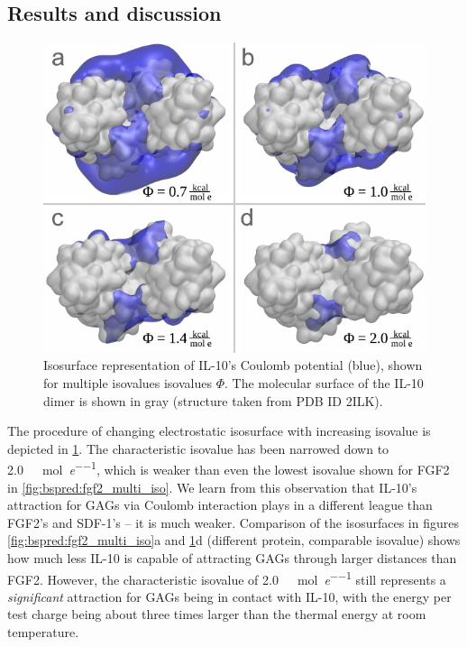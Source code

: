 \subsection{Results and discussion}
\label{bspred:il10}

\begin{figure}
\centering
\includegraphics[width=1.0\textwidth]{gfx/bspred/il10_top_coulomb_isosurfaces_different_values_03_ds.pdf}
\caption[]{
Isosurface representation of IL-10's Coulomb potential (blue), shown for
multiple isovalues isovalues $\Phi$. The molecular surface of the IL-10 dimer is
shown in gray (structure taken from PDB ID 2ILK).
}
\label{fig:bspred:il10_multi_iso}
\end{figure}


The procedure of changing electrostatic isosurface with increasing isovalue is
depicted in \cref{fig:bspred:il10_multi_iso}. The characteristic isovalue has
been narrowed down to \SI{2.0}{\kilo\calory\per\mole\per\elementarycharge},
which is weaker than even the lowest isovalue shown for FGF2 in
\cref{fig:bspred:fgf2_multi_iso}. We learn from this observation that IL-10's
attraction for GAGs via Coulomb interaction plays in a different league than
FGF2's and SDF-1's -- it is much weaker. Comparison of the isosurfaces in
figures \ref{fig:bspred:fgf2_multi_iso}a and \ref{fig:bspred:il10_multi_iso}d
(different protein, comparable isovalue) shows how much less IL-10 is capable of
attracting GAGs through larger distances than FGF2. However, the characteristic
isovalue of \SI{2.0}{\kilo\calory\per\mole\per\elementarycharge} still
represents a \textit{significant} attraction for GAGs being in contact with
IL-10, with the energy per test charge being about three times larger than the
thermal energy at room temperature.

